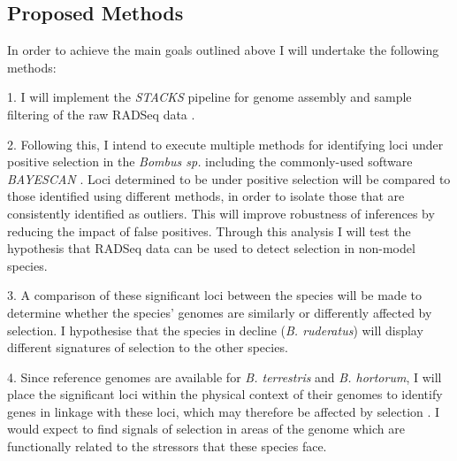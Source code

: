 \documentclass[11pt]{article}
\begin{document}
\begin{linenumbers}
    
    \section{Proposed Methods}
    
    In order to achieve the main goals outlined above I will undertake the following methods:
    
    1. I will implement the \emph{STACKS} pipeline \citep{catchen_stacks_2013} for genome assembly and sample filtering of the raw RADSeq data \citep{rochette_deriving_2017}.
    
    2. Following this, I intend to execute multiple methods for identifying loci under positive selection in the \emph{Bombus sp.} including the commonly-used software \emph{BAYESCAN} \citep{foll_genome-scan_2008, ahrens_search_2018} \citep[e.g.][]{blanco-bercial_new_2016, kang_population_2017, leiva_population_2019, de_jong_detecting_2021}. 
    Loci determined to be under positive selection will be compared to those identified using different methods, in order to isolate those that are consistently identified as outliers. This will improve robustness of inferences by reducing the impact of false positives. Through this analysis I will test the hypothesis that RADSeq data can be used to detect selection in non-model species.


    3. A comparison of these significant loci between the species will be made to determine whether the species' genomes are similarly or differently affected by selection. I hypothesise that the species in decline (\emph{B. ruderatus}) will display different signatures of selection to the other species.
    
    4. Since reference genomes are available for \emph{B. terrestris} and \emph{B. hortorum}, I will place the significant loci within the physical context of their genomes to identify genes in linkage with these loci, which may therefore be affected by selection \citep{manel_genomic_2016}. I would expect to find signals of selection in areas of the genome which are functionally related to the stressors that these species face.


\end{linenumbers}
\end{document}
